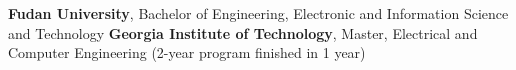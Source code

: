 %
%
%


\begin{scholarship}
					{\textbf{Fudan University}, Bachelor of Engineering, Electronic and Information Science and Technology}
					{\textbf{Georgia Institute of Technology}, Master, Electrical and Computer Engineering}
	\scholarshipentry{}
					{(2-year program finished in 1 year)}
\end{scholarship}
